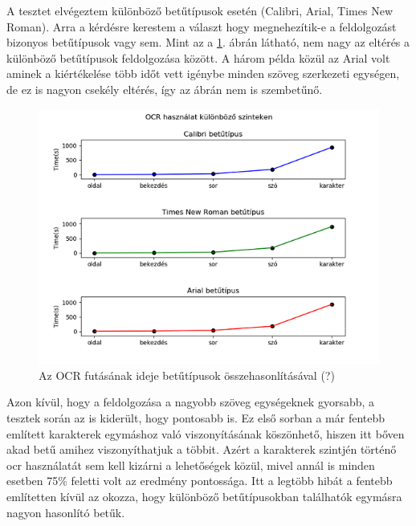 A tesztet elvégeztem különböző betűtípusok esetén (Calibri, Arial, Times New Roman). Arra a kérdésre kerestem a választ hogy megnehezítik-e a feldolgozást bizonyos betűtípusok vagy sem. Mint az a \ref{fig:test font}. ábrán látható, nem nagy az eltérés a különböző betűtípusok feldolgozása között. A három példa közül az Arial volt aminek a kiértékelése több időt vett igénybe minden szöveg szerkezeti egységen, de ez is nagyon csekély eltérés, így az ábrán nem is szembetűnő.

\begin{figure}[H]
\centering
\includegraphics[scale=1]{images/test_ocr_font_types.png}
\caption{Az OCR futásának ideje betűtípusok összehasonlításával (?)}
\label{fig:test font}
\end{figure}

Azon kívül, hogy a feldolgozása a nagyobb szöveg egységeknek gyorsabb, a tesztek során az is kiderült, hogy pontosabb is. Ez első sorban a már fentebb említett karakterek egymáshoz való viszonyításának köszönhető, hiszen itt bőven akad betű amihez viszonyíthatjuk a többit. Azért a karakterek szintjén történő ocr használatát sem kell kizárni a lehetőségek közül, mivel annál is minden esetben 75\% feletti volt az eredmény pontossága. Itt a legtöbb hibát a fentebb említetten kívül az okozza, hogy különböző betűtípusokban találhatók egymásra nagyon hasonlító betűk. 